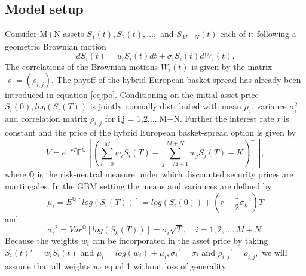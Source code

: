 \documentclass[a4paper]{article}
\begin{document}
\subsection{Model setup}
\label{sec:ms}
Consider M+N assets $S_1(t), S_2(t), ...,$ and $S_{M+N}(t)$ each of it following a geometric Brownian motion
$$dS_i(t) = u_iS_i(t)dt + \sigma_iS_i(t)dW_i(t).$$
The correlations of the Brownian motions $W_i(t)$ is given by the matrix $\varrho=(\rho_{i,j})$. 
The payoff of the hybrid European basket-spread has already been introduced in equation \ref{eq:po}. Conditioning on the initial asset price $S_i(0), log(S_i(T))$ is jointly normally distributed with mean $\mu_i$, variance $\sigma_i^2$ and correlation matrix $\rho_{i,j}$ for i,j = 1,2,...,M+N. 
Further the interest rate $r$ is constant and the price of the hybrid European basket-spread option is given by
\begin{equation}
\label{eq:mg}
V = e^{-rT}\mathbb{E}^{\mathbb{Q}}[(\sum_{i=0}^M w_iS_i(T) - \sum_{j=M+1}^{M+N} w_jS_j(T) - K)^+],
\end{equation}
where $\mathbb{Q}$ is the risk-neutral measure under which discounted security prices are martingales.
In the GBM setting the means and variances are defined by 
$$\mu_i = E^\mathbb{Q}[log(S_i(T))] = log(S_i(0)) + (r-\frac{1}{2}{\sigma_k}^2)T$$ 
and
$${\sigma_i}^2 = Var^\mathbb{Q}[log(S_k(T))] = \sigma_i\sqrt{T}, \quad i=1,2,...,M+N.$$
Because the weights $w_i$ can be incorporated in the asset price by taking $S_i(t)'=w_iS_i(t)$ and $\mu_i=log(w_i)+\mu_i, \sigma_i'=\sigma_i$ and $\rho_{i,j}'=\rho_{i,j},$ we will assume that all weights $w_i$ equal 1 without loss of generality.
\end{document}
